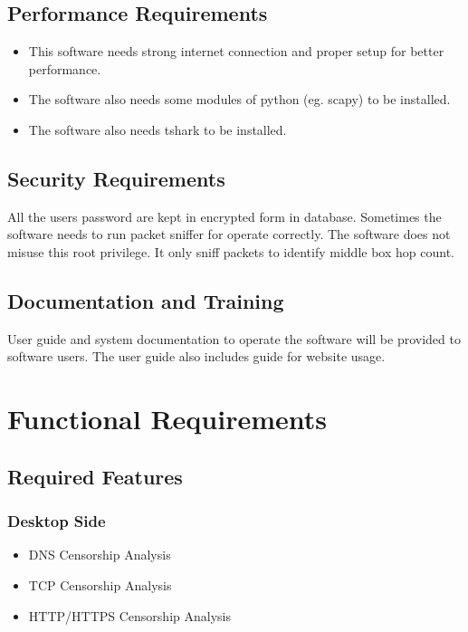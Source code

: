 \documentclass[12pt]{article}
\begin{document}
\subsection{Performance Requirements}
\begin{itemize}
    \item This software needs strong internet connection and proper setup for better performance.
    \item The software also needs some modules of python (eg. scapy) to be installed.
    \item The software also needs tshark to be installed.
\end{itemize}

\subsection{Security Requirements}
All the users password are kept in encrypted form in database. Sometimes the software needs to run packet sniffer for operate correctly. The software does not misuse this root privilege. It only sniff packets to identify middle box hop count.
\subsection{Documentation and Training}
User guide and system documentation to operate the software will be provided to software users. The user guide also includes guide for website usage. 

\section{Functional Requirements}
\subsection{Required Features}
\subsubsection{Desktop Side}
\begin{itemize}
  \item DNS Censorship Analysis
  \item TCP Censorship Analysis
  \item HTTP/HTTPS Censorship Analysis
\end{itemize}
\end{document}
